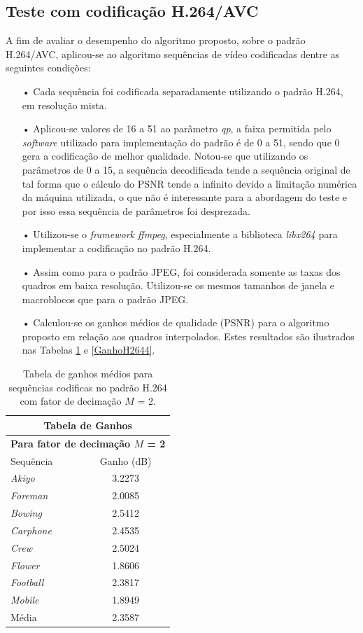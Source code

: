 \subsection{Teste com codificação H.264/AVC}

A fim de avaliar o desempenho do algoritmo proposto, sobre o padrão H.264/AVC, aplicou-se ao algoritmo sequências de vídeo codificadas dentre as seguintes condições:
\begin{itemize}
 \setlength\itemsep{1cm}
\item[•] Cada sequência foi codificada separadamente utilizando o padrão H.264, em resolução mista. 
\item[•] Aplicou-se valores de 16 a 51 ao parâmetro  \textit{qp}, a faixa permitida pelo \textit{software} utilizado para implementação do padrão é de 0 a 51, sendo que 0 gera a codificação de melhor qualidade. Notou-se que utilizando os parâmetros de 0 a 15, a sequência decodificada tende a sequência original de tal forma que o cálculo do PSNR tende a infinito devido a limitação numérica da máquina utilizada, o que não é interessante para a abordagem do teste e por isso essa sequência de parâmetros foi desprezada. 
\item[•] Utilizou-se o \textit{framework ffmpeg}, especialmente a biblioteca \textit{libx264} para implementar a codificação no padrão H.264.
\item[•] Assim como para o padrão JPEG, foi considerada somente as taxas dos quadros em baixa resolução. Utilizou-se os mesmos tamanhos de janela e macroblocos que para o padrão JPEG.
\item[•] Calculou-se os ganhos médios \cite{bjontegaard2001calcuation} de qualidade (PSNR) para o algoritmo proposto em relação aos quadros interpolados. Estes resultados são ilustrados nas Tabelas \ref{GanhoH2642} e \ref{GanhoH2644}.
\end{itemize}

\begin{table}[hbt]
\centering
\caption{Tabela de ganhos médios para sequências codificas no padrão H.264 com fator de decimação $M$ = 2.}
\label{GanhoH2642}
\begin{tabular}{l|c}
\hline
\multicolumn{2}{c}{\textbf{Tabela de Ganhos}}\\
\hline
\hline
\multicolumn{2}{c}{\textbf{Para fator de decimação $M$ = 2}}\\
\hline
\hline			
Sequência	    & Ganho (dB)\\
\hline
\hline
\textit{Akiyo}		&3.2273\\
\hline
\textit{Foreman}		&2.0085\\
\hline
\textit{Bowing}		&2.5412\\
\hline
\textit{Carphone}	&2.4535\\
\hline
\textit{Crew}		&2.5024\\
\hline
\textit{Flower}		&1.8606\\
\hline
\textit{Football}	&2.3817\\
\hline
\textit{Mobile}	&1.8949\\
\hline
\hline
Média		&2.3587\\
\hline
\end{tabular}

\end{table}

